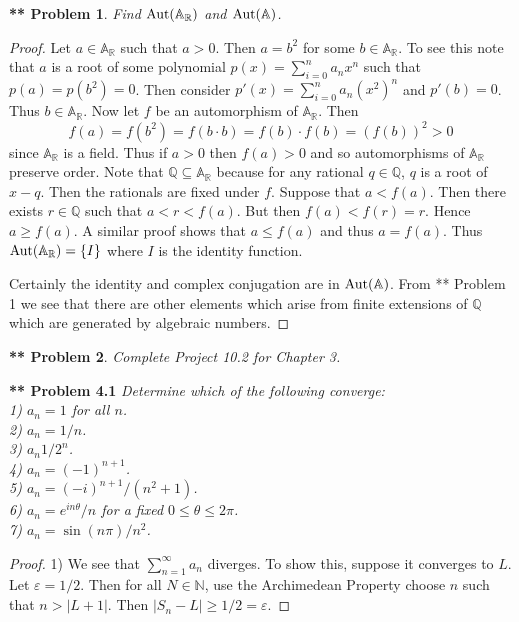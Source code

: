 \documentclass{article}
\newtheorem{**}{** Problem}
\newcommand{\aut}[1]{\textup{Aut}(#1)}
\begin{document}
\begin{flushleft}
\begin{**}
Find $\aut{\mathbb{A}_{\mathbb{R}}}$ and $\aut{\mathbb{A}}$.
\end{**}
\begin{proof}
Let $a \in \mathbb{A}_{\mathbb{R}}$ such that $a > 0$. Then $a = b^2$ for some $b \in \mathbb{A}_{\mathbb{R}}$. To see this note that $a$ is a root of some polynomial $p(x) = \sum_{i=0}^{n} a_n x^n$ such that $p(a) = p(b^2) = 0$. Then consider $p'(x) = \sum_{i=0}^{n} a_n (x^2)^n$ and $p'(b) = 0$. Thus $b \in \mathbb{A}_{\mathbb{R}}$. Now let $f$ be an automorphism of $\mathbb{A}_{\mathbb{R}}$. Then
\[
f(a) = f(b^2) = f(b \cdot b) = f(b) \cdot f(b) = (f(b))^2 > 0
\]
since $\mathbb{A}_{\mathbb{R}}$ is a field. Thus if $a > 0$ then $f(a) > 0$ and so automorphisms of $\mathbb{A}_{\mathbb{R}}$ preserve order. Note that $\mathbb{Q} \subseteq \mathbb{A}_{\mathbb{R}}$ because for any rational $q \in \mathbb{Q}$, $q$ is a root of $x - q$. Then the rationals are fixed under $f$. Suppose that $a < f(a)$. Then there exists $r \in \mathbb{Q}$ such that $a < r < f(a)$. But then $f(a) < f(r) = r$. Hence $a \geq f(a)$. A similar proof shows that $a \leq f(a)$ and thus $a = f(a)$. Thus $\aut{\mathbb{A}_{\mathbb{R}}} = \{I\}$ where $I$ is the identity function.\newline

Certainly the identity and complex conjugation are in $\aut{\mathbb{A}}$. From ** Problem 1 we see that there are other elements which arise from finite extensions of $\mathbb{Q}$ which are generated by algebraic numbers.
\end{proof}

\begin{**}
Complete Project 10.2 for Chapter 3.
\end{**}

\textbf{** Problem 4.1}
\textit{Determine which of the following converge:\\
1) $a_n = 1$ for all $n$.\\
2) $a_n = 1/n$.\\
3) $a_n 1/2^n$.\\
4) $a_n = (-1)^{n+1}$.\\
5) $a_n = (-i)^{n+1}/(n^2+1)$.\\
6) $a_n = e^{in\theta}/n$ for a fixed $0 \leq \theta \leq 2 \pi$.\\
7) $a_n = \sin (n \pi)/n^2$.}
\begin{proof}
1) We see that $\sum_{n=1}^{\infty} a_n$ diverges. To show this, suppose it converges to $L$. Let $\varepsilon = 1/2$. Then for all $N \in \mathbb{N}$, use the Archimedean Property choose $n$ such that $n > |L + 1|$. Then $|S_n - L| \geq 1/2 = \varepsilon$.\newline


\end{proof}
\end{flushleft}
\end{document}
